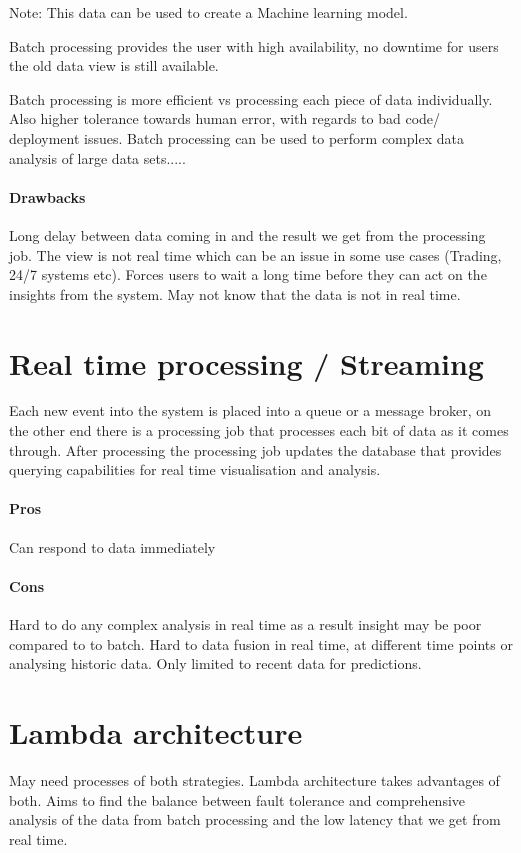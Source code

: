 \documentclass[a4paper, 11pt]{book}
\begin{document}
    Note: This data can be used to create a Machine learning model.

    Batch processing provides the user with high availability, no downtime for users the old data view is still available.

    Batch processing is more efficient vs processing each piece of data individually. Also higher tolerance towards human error, with regards to bad code/ deployment issues.
    Batch processing can be used to perform complex data analysis of large data sets.....

    \paragraph{Drawbacks}
    Long delay between data coming in and the result we get from the processing job.
    The view is not real time which can be an issue in some use cases (Trading, 24/7 systems etc).
    Forces users to wait a long time before they can act on the insights from the system.
    May not know that the data is not in real time.


    \section{Real time processing / Streaming}
    Each new event into the system is placed into a queue or a message broker, on the other end there is a processing job that processes each bit of data as it comes through.
    After processing the processing job updates the database that provides querying capabilities for real time visualisation and analysis.

    \paragraph{Pros}
    Can respond to data immediately

    \paragraph{Cons}
    Hard to do any complex analysis in real time as a result insight may be poor compared to to batch.
    Hard to data fusion in real time, at different time points or analysing historic data. Only limited to recent data for predictions.


    \section{Lambda architecture}
    May need processes of both strategies.
    Lambda architecture takes advantages of both.
    Aims to find the balance between fault tolerance and comprehensive analysis of the data from batch processing and the low latency that we get from real time.
\end{document}
